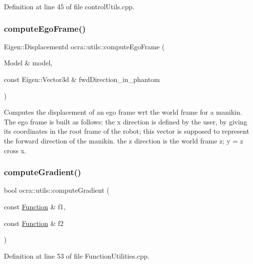Definition at line 45 of file control\+Utils.\+cpp.

\hypertarget{namespaceocra_1_1utils_a54960ab215262788c23ca1eee8786b5a}{}\label{namespaceocra_1_1utils_a54960ab215262788c23ca1eee8786b5a} 
\subsubsection{\texorpdfstring{compute\+Ego\+Frame()}{computeEgoFrame()}\hspace{0.1cm}{\footnotesize\ttfamily [2/2]}}
{\footnotesize\ttfamily Eigen\+::\+Displacementd ocra\+::utils\+::compute\+Ego\+Frame (\begin{DoxyParamCaption}\item[{Model \&}]{model,  }\item[{const Eigen\+::\+Vector3d \&}]{fwd\+Direction\+\_\+in\+\_\+phantom }\end{DoxyParamCaption})}

Computes the displacement of an ego frame wrt the world frame for a manikin. The ego frame is built as follows\+: the x direction is defined by the user, by giving its coordinates in the root frame of the robot; this vector is supposed to represent the \textquotesingle{}forward\textquotesingle{} direction of the manikin. the z direction is the world frame z; y = z cross x. \hypertarget{namespaceocra_1_1utils_a02a6c3a9f1fe61b2ae034dee1b75a795}{}\label{namespaceocra_1_1utils_a02a6c3a9f1fe61b2ae034dee1b75a795} 
\subsubsection{\texorpdfstring{compute\+Gradient()}{computeGradient()}}
{\footnotesize\ttfamily bool ocra\+::utils\+::compute\+Gradient (\begin{DoxyParamCaption}\item[{const \hyperlink{classocra_1_1Function}{Function} \&}]{f1,  }\item[{const \hyperlink{classocra_1_1Function}{Function} \&}]{f2 }\end{DoxyParamCaption})}



Definition at line 53 of file Function\+Utilities.\+cpp.

